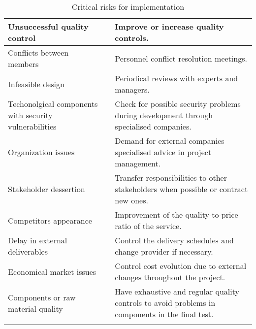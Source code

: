 \begin{longtable}[H]{p{4cm} p{4.7cm} p{5cm}}
 	\midrule

	Unsuccessful quality control &  & Improve or increase quality controls. \vspace{0.2cm} \\
 	
 	\midrule

	Conflicts between members  &  & Personnel conflict resolution meetings. \vspace{0.2cm} \\
 	
 	\midrule

 	Infeasible design &  & Periodical reviews with experts and managers. \vspace{0.2cm} \\
 	
 	\midrule

	Techonolgical components with security vulnerabilities &  & Check for possible security problems during development through specialised companies. \vspace{0.2cm} \\
 	
 	\midrule

	Organization issues &  & Demand for external companies specialised advice in project management. \vspace{0.2cm} \\
 	
 	\midrule

	Stakeholder dessertion &  & Transfer responsibilities to other stakeholders when possible or contract new ones. \vspace{0.2cm} \\
 	
 	\midrule

	Competitors appearance &  & Improvement of the quality-to-price ratio of the service. \vspace{0.2cm} \\
 	
 	\midrule

	Delay in external deliverables &  & Control the delivery schedules and change provider if necessary. \vspace{0.2cm} \\
 	
 	\midrule

	Economical market issues &  & Control cost evolution due to external changes throughout the project. \vspace{0.2cm} \\
 	
 	\midrule

	Components or raw material quality &  & Have exhaustive and regular quality controls to avoid problems in components in the final test. \vspace{0.2cm} \\
	
	\bottomrule[2pt]
	
	\caption{Critical risks for implementation}
	\label{workpackages}
\end{longtable}

